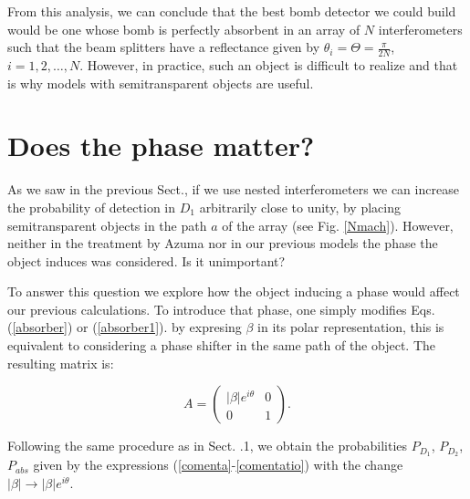 \documentclass[12pt]{book}
\begin{document}
From this analysis, we can conclude that the best bomb detector we could build would be one whose bomb is perfectly absorbent in an array of $N$ interferometers such that the beam splitters have a reflectance given by $\theta_{i}=\Theta=\frac{\pi}{2 N}$, $i=1,2,\dots,N$. However, in practice, such an object is difficult to realize and that is why models with semitransparent objects are useful.
 

\section{Does the phase matter?}

As we saw in the previous Sect., if we use nested interferometers we can increase the probability of detection in $D_{1}$ arbitrarily close to unity, by placing semitransparent objects in the path $a$ of the array (see Fig. \ref{Nmach}). However, neither in the treatment by Azuma \cite{Azuma} nor in our previous models the phase the object induces was considered. Is it unimportant?

To answer this question we explore how the object inducing a phase would affect our previous calculations. To introduce that phase, one simply modifies Eqs. (\ref{absorber}) or (\ref{absorber1}). by expresing $\beta$ in its polar representation, this is equivalent to considering a phase shifter in the same path of the object. The resulting matrix is:

\begin{equation}
 A=\begin{pmatrix} |\beta| e^{i \theta}& 0\\0&  1\end{pmatrix}.
 \end{equation}

Following the same procedure as in Sect. .1, we obtain the probabilities $P_{D_{1}}$, $P_{D_{2}}$, $P_{abs}$ given by the expressions (\ref{comenta}-\ref{comentatio}) with the change $|\beta|\xrightarrow{}|\beta|e^{i\theta}$.
\end{document}
